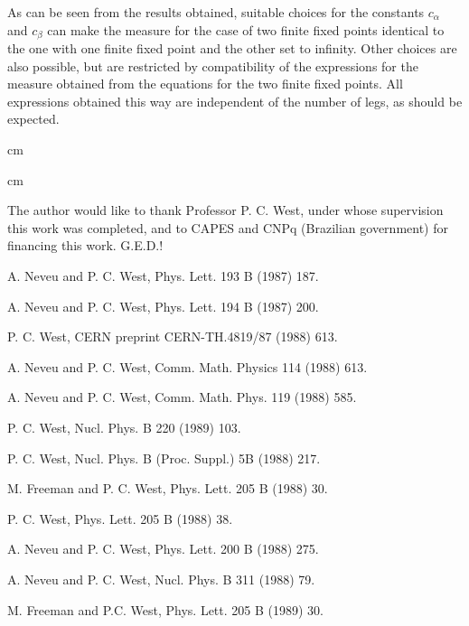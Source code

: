 \documentclass[a4paper,12pt]{article}
\begin{document}
As can be seen from the results obtained, suitable choices for the constants $c_\alpha $ and $c_\beta $ can make the measure for the case of two finite fixed points identical to the one with one finite fixed point and the other set to infinity. Other choices are also possible, but are restricted by compatibility of the expressions for the measure obtained from the equations for the two finite fixed points. All expressions obtained this way are independent of the number of legs, as should be expected.

 cm


 cm

The author would like to thank Professor P. C. West, under whose supervision this work was completed, and to CAPES and CNPq (Brazilian government) for financing this work. G.E.D.!

\begin{thebibliography}{99}

 A. Neveu and P. C. West, Phys. Lett. 193 B (1987) 187.

A. Neveu and P. C. West, Phys. Lett. 194 B (1987) 200.

P. C. West, CERN preprint CERN-TH.4819/87 (1988) 613.

 A. Neveu and P. C. West, Comm. Math. Physics 114 (1988) 613.

 A. Neveu and P. C. West, Comm. Math. Phys. 119 (1988) 585.

 P. C. West, Nucl. Phys. B 220 (1989) 103.

 P. C. West, Nucl. Phys. B (Proc. Suppl.) 5B (1988) 217.

 M. Freeman and P. C. West, Phys. Lett. 205 B (1988) 30.

 P. C. West, Phys. Lett. 205 B (1988) 38.

 A. Neveu and P. C. West, Phys. Lett. 200 B (1988) 275.

A. Neveu and P. C. West, Nucl. Phys. B 311 (1988) 79.

M. Freeman and P.C. West, Phys. Lett. 205 B (1989) 30.

\end{thebibliography}
\end{document}
